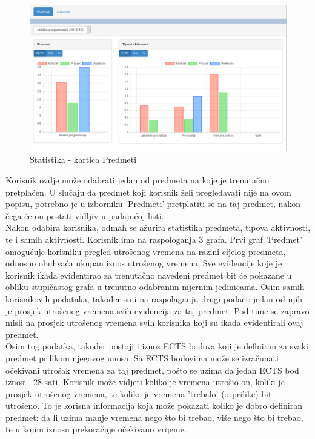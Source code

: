 \documentclass[times, utf8, zavrsni]{fer}
\begin{document}
\begin{figure}[H]
\centering
\includegraphics[width=\textwidth,height=\textheight,keepaspectratio]{img/statistika-web.png}
\caption{Statistika - kartica Predmeti}
\label{fig:statistika-web}
\end{figure}

Korisnik ovdje može odabrati jedan od predmeta na koje je trenutačno pretplaćen. U slučaju da predmet koji korisnik želi pregledavati nije na ovom popisu, potrebno je u izborniku 'Predmeti' pretplatiti se na taj predmet, nakon čega će on postati vidljiv u padajućoj listi.\\

Nakon odabira korisnika, odmah se ažurira statistika predmeta, tipova aktivnosti, te i samih aktivnosti. Korisnik ima na raspologanja 3 grafa. Prvi graf 'Predmet' omogućuje korisniku pregled utrošenog vremena na razini cijelog predmeta, odnosno obuhvaća ukupan iznos utrošenog vremena. Sve evidencije koje je korisnik ikada evidentirao za trenutačno navedeni predmet bit će pokazane u obliku stupičastog grafa u trenutno odabranim mjernim jedinicama. Osim samih korisnikovih podataka, također su i na raspolaganju drugi podaci: jedan od njih je prosjek utrošenog vremena svih evidencija za taj predmet. Pod time se zapravo misli na prosjek utrošenog vremena svih korisnika koji su ikada evidentirali ovaj predmet.\\

Osim tog podatka, također postoji i iznos ECTS bodova koji je definiran za svaki predmet prilikom njegovog unosa. Sa ECTS bodovima može se izračunati očekivani utrošak vremena za taj predmet, pošto se uzima da jedan ECTS bod iznosi ~28 sati. Korisnik može vidjeti koliko je vremena utrošio on, koliki je prosjek utrošenog vremena, te koliko je vremena 'trebalo' (otprilike) biti utrošeno. To je korisna informacija koja može pokazati koliko je dobro definiran predmet: da li uzima manje vremena nego što bi trebao, više nego što bi trebao, te u kojim iznosu prekoračuje očekivano vrijeme.\\
\end{document}

